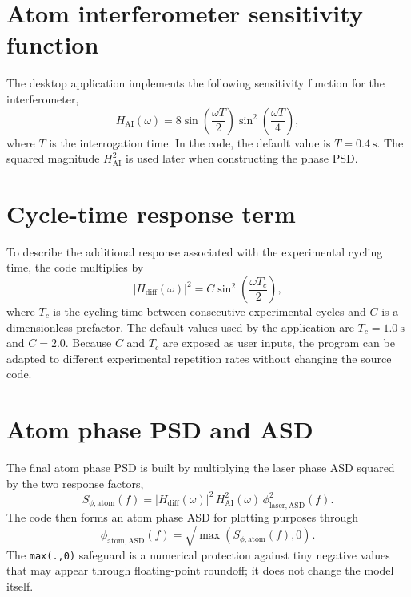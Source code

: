 \documentclass[11pt,a4paper]{report}
\begin{document}
\section{Atom interferometer sensitivity function}

The desktop application implements the following sensitivity function for the interferometer,
\begin{equation}
H_{\mathrm{AI}}(\omega) = 8\sin\left(\frac{\omega T}{2}\right)\sin^2\left(\frac{\omega T}{4}\right),
\label{eq:hai}
\end{equation}
where $T$ is the interrogation time. In the code, the default value is $T = 0.4~\mathrm{s}$. The squared magnitude $H_{\mathrm{AI}}^2$ is used later when constructing the phase PSD.

\section{Cycle-time response term}

To describe the additional response associated with the experimental cycling time, the code multiplies by
\begin{equation}
|H_{\mathrm{diff}}(\omega)|^2 = C\sin^2\left(\frac{\omega T_c}{2}\right),
\label{eq:hdiff}
\end{equation}
where $T_c$ is the cycling time between consecutive experimental cycles and $C$ is a dimensionless prefactor. The default values used by the application are $T_c = 1.0~\mathrm{s}$ and $C = 2.0$. Because $C$ and $T_c$ are exposed as user inputs, the program can be adapted to different experimental repetition rates without changing the source code.

\section{Atom phase PSD and ASD}

The final atom phase PSD is built by multiplying the laser phase ASD squared by the two response factors,
\begin{equation}
S_{\phi,\mathrm{atom}}(f) = |H_{\mathrm{diff}}(\omega)|^2\,H_{\mathrm{AI}}^2(\omega)\,\phi_{\mathrm{laser,ASD}}^2(f).
\label{eq:atom_psd}
\end{equation}
The code then forms an atom phase ASD for plotting purposes through
\begin{equation}
\phi_{\mathrm{atom,ASD}}(f) = \sqrt{\max\left(S_{\phi,\mathrm{atom}}(f), 0\right)}.
\end{equation}
The \texttt{max(.,0)} safeguard is a numerical protection against tiny negative values that may appear through floating-point roundoff; it does not change the model itself.
\end{document}
